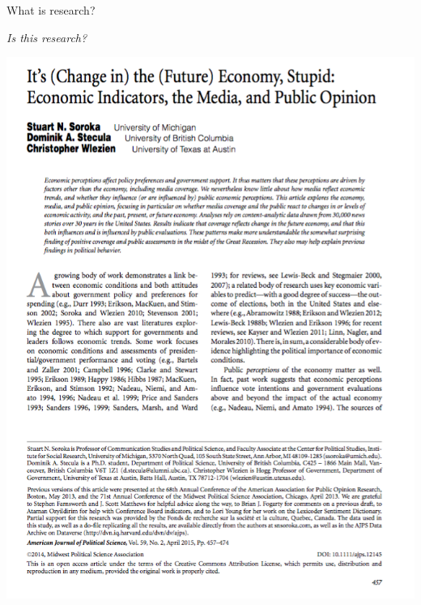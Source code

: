 \documentclass[10pt]{beamer}
\begin{document}
\begin{frame}{What is research?}

    \begin{center}
        {\large{\emph{Is this research?}}}

        \vspace{0.5cm}

        \includegraphics[scale=0.2]{img/journal_ss.png}
    \end{center}
\end{frame}
\end{document}
